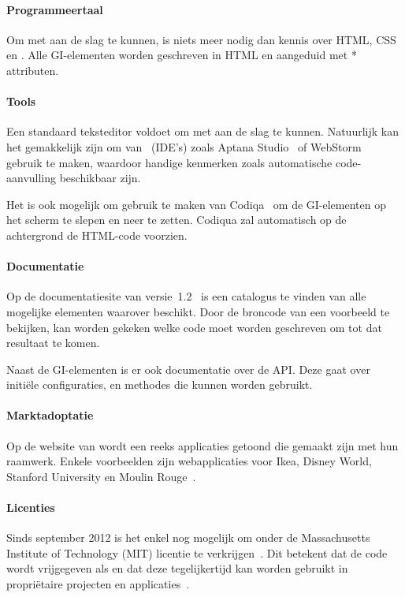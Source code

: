 \paragraph{Programmeertaal}
Om met \jqm{} aan de slag te kunnen, is niets meer nodig dan kennis over HTML, CSS en \js{}. 
Alle GI-elementen worden geschreven in HTML en aangeduid met * attributen.

\paragraph{Tools}
Een standaard teksteditor voldoet om met \jqm{} aan de slag te kunnen. 
Natuurlijk kan het gemakkelijk zijn om van ~(IDE's) zoals Aptana Studio~\cite{Aptana2012} of WebStorm~\cite{JetBrains2012} gebruik te maken, waardoor handige kenmerken zoals automatische code-aanvulling beschikbaar zijn.

Het is ook mogelijk om gebruik te maken van Codiqa~\cite{Sperry2012} om de GI-elementen op het scherm te slepen en neer te zetten. 
Codiqua zal automatisch op de achtergrond de HTML-code voorzien.

\paragraph{Documentatie}
Op de documentatiesite van versie~1.2~\cite{JQuery2012b} is een catalogus te vinden van alle mogelijke elementen waarover \jqm{} beschikt. 
Door de broncode van een voorbeeld te bekijken, kan worden gekeken welke code moet worden geschreven om tot dat resultaat te komen.

Naast de GI-elementen is er ook documentatie over de API. 
Deze gaat over initiële configuraties,  en methodes die kunnen worden gebruikt.

\paragraph{Marktadoptatie}
Op de website van \jqm{} wordt een reeks applicaties getoond die gemaakt zijn met hun raamwerk. 
Enkele voorbeelden zijn webapplicaties voor Ikea, Disney World, Stanford University en Moulin Rouge~\cite{JQuery2012a}. 

\paragraph{Licenties}
Sinds september 2012 is het enkel nog mogelijk om \jqm{} onder de Massachusetts Institute of Technology (MIT) licentie te verkrijgen~\cite{Dmethvin2012}. 
Dit betekent dat de code wordt vrijgegeven als  en dat deze tegelijkertijd kan worden gebruikt in propriëtaire projecten en applicaties~\cite{PhilDutson2012}.

